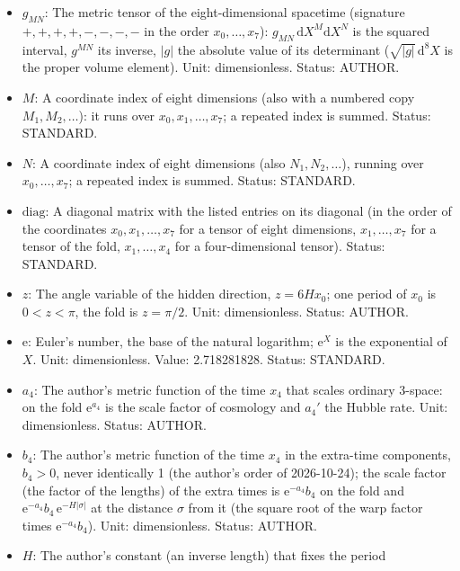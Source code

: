\documentclass[
  10pt,
]{article}
\providecommand{\tightlist}{%
  \setlength{\itemsep}{0pt}\setlength{\parskip}{0pt}}
\begin{document}
\begin{itemize}
\tightlist
\item
  \(g_{MN}\): The metric tensor of the eight-dimensional spacetime
  (signature \(+,+,+,+,-,-,-,-\) in the order \(x_0, \dots, x_7\)):
  \(g_{MN}\,\mathrm{d}X^M\mathrm{d}X^N\) is the squared interval,
  \(g^{MN}\) its inverse, \(\lvert g\rvert\) the absolute value of its
  determinant (\(\sqrt{\lvert g\rvert}\,\mathrm{d}^8X\) is the proper
  volume element). Unit: dimensionless. Status: AUTHOR.
\item
  \(M\): A coordinate index of eight dimensions (also with a numbered
  copy \(M_1, M_2, \dots\)): it runs over \(x_0, x_1, \dots, x_7\); a
  repeated index is summed. Status: STANDARD.
\item
  \(N\): A coordinate index of eight dimensions (also
  \(N_1, N_2, \dots\)), running over \(x_0, \dots, x_7\); a repeated
  index is summed. Status: STANDARD.
\item
  \(\mathrm{diag}\): A diagonal matrix with the listed entries on its
  diagonal (in the order of the coordinates \(x_0, x_1, \dots, x_7\) for
  a tensor of eight dimensions, \(x_1, \dots, x_7\) for a tensor of the
  fold, \(x_1, \dots, x_4\) for a four-dimensional tensor). Status:
  STANDARD.
\item
  \(z\): The angle variable of the hidden direction, \(z = 6Hx_0\); one
  period of \(x_0\) is \(0 < z < \pi\), the fold is \(z = \pi/2\). Unit:
  dimensionless. Status: AUTHOR.
\item
  \(\mathrm{e}\): Euler's number, the base of the natural logarithm;
  \(\mathrm{e}^{X}\) is the exponential of \(X\). Unit: dimensionless.
  Value: 2.718281828. Status: STANDARD.
\item
  \(a_4\): The author's metric function of the time \(x_4\) that scales
  ordinary 3-space: on the fold \(\mathrm{e}^{a_4}\) is the scale factor
  of cosmology and \(a_4'\) the Hubble rate. Unit: dimensionless.
  Status: AUTHOR.
\item
  \(b_4\): The author's metric function of the time \(x_4\) in the
  extra-time components, \(b_4 > 0\), never identically 1 (the author's
  order of 2026-10-24); the scale factor (the factor of the lengths) of
  the extra times is \(\mathrm{e}^{-a_4}b_4\) on the fold and
  \(\mathrm{e}^{-a_4}b_4\,\mathrm{e}^{-H\lvert\sigma\rvert}\) at the
  distance \(\sigma\) from it (the square root of the warp factor times
  \(\mathrm{e}^{-a_4}b_4\)). Unit: dimensionless. Status: AUTHOR.
\item
  \(H\): The author's constant (an inverse length) that fixes the period

\end{itemize}
\end{document}
